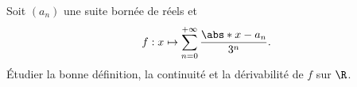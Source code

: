 \begin{enonce}
\begin{exercise}[ID={RMS126 E509},subtitle={Mines-Ponts PSI 2015},tags={}, difficulty={0}]
Soit $\left( a_n \right)$ une suite bornée de réels et 
\begin{equation*}
  f:x\mapsto \sum_{n=0}^{+\infty} \frac{\abs*{x - a_n}}{3^n}.
\end{equation*}
Étudier la bonne définition, la continuité et la dérivabilité de $f$ sur $\R$.
\end{exercise}
\begin{solution}
\end{solution}
\end{enonce}
